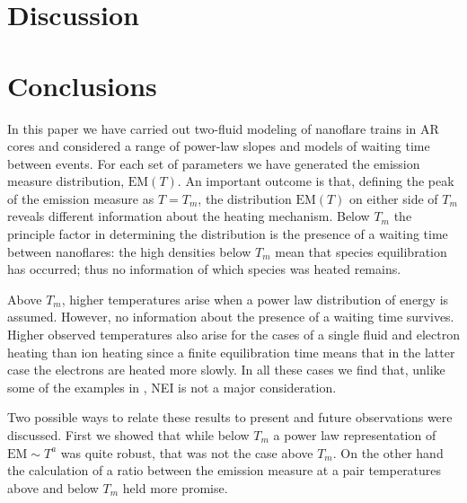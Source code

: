 \documentclass[preprint,linenumbers]{aastex}
\begin{document}
	\section{Discussion}
	\label{sec:discussion}
	\section{Conclusions}
	\label{sec:conclusions}
	\par In this paper we have carried out two-fluid modeling of nanoflare trains in AR cores and considered a range of power-law slopes and models of waiting time between events. For each set of parameters we have generated the emission measure distribution, $\mathrm{EM}(T)$. An important outcome is that, defining the peak of the emission measure as $T = T_m$, the distribution $\mathrm{EM}(T)$ on either side of $T_m$ reveals different information about the heating mechanism. Below $T_m$ the principle factor in determining the distribution is the presence of a waiting time between nanoflares: the high densities below $T_m$ mean that species equilibration has occurred; thus no information of which species was heated remains.
	\par Above $T_m$, higher temperatures arise when a power law distribution of energy is assumed. However, no information about the presence of a waiting time survives. Higher observed temperatures also arise for the cases of a single fluid and electron heating than ion heating since a finite equilibration time means that in the latter case the electrons are heated more slowly. In all these cases we find that, unlike some of the examples in , NEI is not a major consideration.
	\par Two possible ways to relate these results to present and future observations were discussed. First we showed that while below $T_m$ a power law representation of $\mathrm{EM}\sim T^a$ was quite robust, that was not the case above $T_m$. On the other hand the calculation of a ratio between the emission measure at a pair temperatures above and below $T_m$ held more promise. 
\end{document}
